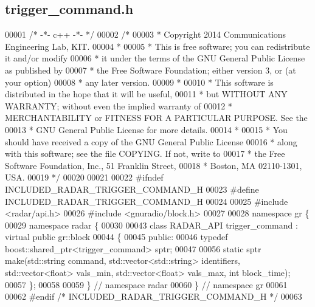 \subsection{trigger\+\_\+command.\+h}
\label{trigger__command_8h_source}

\begin{DoxyCode}
00001 \textcolor{comment}{/* -*- c++ -*- */}
00002 \textcolor{comment}{/* }
00003 \textcolor{comment}{ * Copyright 2014 Communications Engineering Lab, KIT.}
00004 \textcolor{comment}{ * }
00005 \textcolor{comment}{ * This is free software; you can redistribute it and/or modify}
00006 \textcolor{comment}{ * it under the terms of the GNU General Public License as published by}
00007 \textcolor{comment}{ * the Free Software Foundation; either version 3, or (at your option)}
00008 \textcolor{comment}{ * any later version.}
00009 \textcolor{comment}{ * }
00010 \textcolor{comment}{ * This software is distributed in the hope that it will be useful,}
00011 \textcolor{comment}{ * but WITHOUT ANY WARRANTY; without even the implied warranty of}
00012 \textcolor{comment}{ * MERCHANTABILITY or FITNESS FOR A PARTICULAR PURPOSE.  See the}
00013 \textcolor{comment}{ * GNU General Public License for more details.}
00014 \textcolor{comment}{ * }
00015 \textcolor{comment}{ * You should have received a copy of the GNU General Public License}
00016 \textcolor{comment}{ * along with this software; see the file COPYING.  If not, write to}
00017 \textcolor{comment}{ * the Free Software Foundation, Inc., 51 Franklin Street,}
00018 \textcolor{comment}{ * Boston, MA 02110-1301, USA.}
00019 \textcolor{comment}{ */}
00020 
00021 
00022 \textcolor{preprocessor}{#ifndef INCLUDED\_RADAR\_TRIGGER\_COMMAND\_H}
00023 \textcolor{preprocessor}{#define INCLUDED\_RADAR\_TRIGGER\_COMMAND\_H}
00024 
00025 \textcolor{preprocessor}{#include <radar/api.h>}
00026 \textcolor{preprocessor}{#include <gnuradio/block.h>}
00027 
00028 \textcolor{keyword}{namespace }gr \{
00029   \textcolor{keyword}{namespace }radar \{
00030 
00043     \textcolor{keyword}{class }RADAR_API trigger_command : \textcolor{keyword}{virtual} \textcolor{keyword}{public} gr::block
00044     \{
00045      \textcolor{keyword}{public}:
00046       \textcolor{keyword}{typedef} boost::shared\_ptr<trigger\_command> sptr;
00047 
00056       \textcolor{keyword}{static} sptr make(std::string command, std::vector<std::string> identifiers, std::vector<float> 
      vals\_min, std::vector<float> vals\_max, \textcolor{keywordtype}{int} block\_time);
00057     \};
00058 
00059   \} \textcolor{comment}{// namespace radar}
00060 \} \textcolor{comment}{// namespace gr}
00061 
00062 \textcolor{preprocessor}{#endif }\textcolor{comment}{/* INCLUDED\_RADAR\_TRIGGER\_COMMAND\_H */}\textcolor{preprocessor}{}
00063 
\end{DoxyCode}
